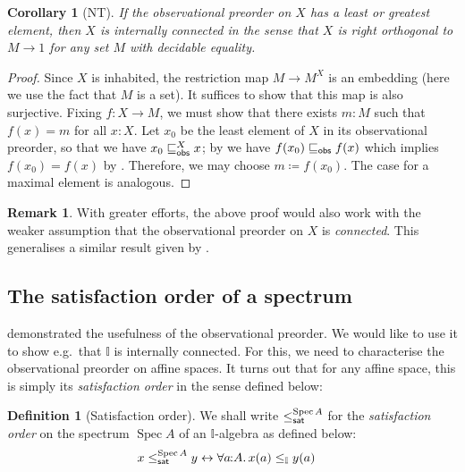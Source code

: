 \documentclass[a4paper,12pt]{amsart}
\newtheorem{corollary}[theorem]{Corollary}
\theoremstyle{definition}
\newtheorem{definition}[theorem]{Definition}
\newtheorem{remark}[theorem]{Remark}
\newcommand{\mbb}[1]{\mathbb{#1}}
\newcommand{\I}{\mbb I}
\newcommand{\fa}[2]{\forall #1\!\colon\!\!#2\mathpunct{.}}
\newcommand{\eq}{\leftrightarrow}
\newcommand{\spec}{\operatorname{Spec}}
\begin{document}
\begin{corollary}[NT]\label{cor:connectedpreservediscrete}
  If the observational preorder on $X$ has a least or greatest element, then $X$ is \emph{internally connected} in the sense that $X$ is right orthogonal to $M \to 1$ for any set $M$ with decidable equality.
\end{corollary}
\begin{proof}
  Since $X$ is inhabited, the restriction map $M \to M^X$ is an embedding (here we use the fact that $M$ is a set). It suffices to show that this map is also surjective.
  Fixing $f\colon X\to M$, we must show that there exists $m:M$ such that $f(x) = m$ for all $x:X$. Let $x_0$ be the least element of $X$ in its observational preorder, so that we have $x_0\obsle[X] x$; by  we have $f(x_0) \obsle f(x)$ which implies $f(x_0) = f(x)$ by . Therefore, we may choose $m\coloneq f(x_0)$. The case for a maximal element is analogous.
\end{proof}

\begin{remark}
  With greater efforts, the above proof would also work with the weaker assumption that the observational preorder on $X$ is \emph{connected}. This generalises a similar result given by \citet[Prop.~4.4.1]{hyland1990first}.
\end{remark}


\subsection{The satisfaction order of a spectrum}

 demonstrated the usefulness of the observational preorder. We would like to use it to show e.g.\ that $\I$ is internally connected. For this, we need to characterise the observational preorder on affine spaces. It turns out that for any affine space, this is simply its \emph{satisfaction order} in the sense defined below:


\begin{definition}[Satisfaction order]
  We shall write $\satle[\spec{A}]$ for the \emph{satisfaction order} on the spectrum $\spec{A}$ of an $\I$-algebra as defined below:
  \begin{align*}
    x\satle[\spec{A}] y 
    &\eq \fa{a}{A}
    x(a) \le_\I y(a) 
  \end{align*}
\end{definition}
\end{document}
